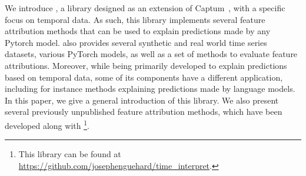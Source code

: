 We introduce \texttt{}, a library designed as an extension of
Captum~\citep{kokhlikyan2020captum}, with a specific focus on temporal data.
As such, this library implements several feature attribution methods that can be used to explain predictions made by
any Pytorch model.
\texttt{} also provides several synthetic and real world time series datasets, various PyTorch
models, as well as a set of methods to evaluate feature attributions.
Moreover, while being primarily developed to explain predictions based on temporal data, some of its components have a
different application, including for instance methods explaining predictions made by language models.
In this paper, we give a general introduction of this library.
We also present several previously unpublished feature attribution methods, which have been developed along with
\texttt{}\footnote{
    This library can be found at \url{https://github.com/josephenguehard/time_interpret}.
}.
